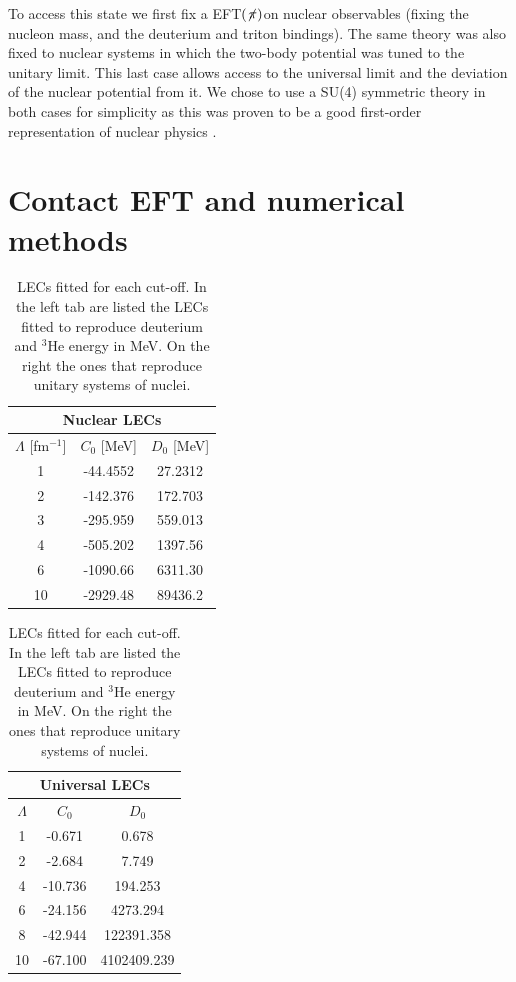 \documentclass[aps,onecolumn,preprintnumbers,amsmath,amssymb,nofootinbib,superscriptaddress,notitlepage]{revtex4-1}
\newcommand{\eftnopi}{\mbox{EFT$(\not \! \pi)$}}
\begin{document}
%
To access this state we first fix a \eftnopi on nuclear observables (fixing the nucleon mass, and the deuterium and triton bindings).
The same theory was also fixed to nuclear systems in which the two-body potential was tuned to the unitary limit.
This last case allows access to the universal limit and the deviation of the nuclear potential from it.
We chose to use a SU(4) symmetric theory in both cases for simplicity as this was proven to be a good first-order representation of nuclear physics \cite{Konig:2016utl}. 









\section{Contact EFT and numerical methods}

\begin{table}
    \centering
    \begin{tabular}{|ccc|}
    \hline
    \multicolumn{3}{|c|}{Nuclear LECs}\\
    \hline
         $\Lambda$ [fm$^{-1}$] & $C_0$ [MeV] & $D_0$ [MeV] \\
1   &	-44.4552	&	27.2312 \\
2	&   -142.376	&	172.703 \\
3	&   -295.959	&	559.013 \\
4	&   -505.202	&	1397.56 \\
6	&   -1090.66	&	6311.30 \\
10	&   -2929.48	&	89436.2 \\
    \hline
    \end{tabular}
    \quad
\begin{tabular}{|ccc|}
    \hline
    \multicolumn{3}{|c|}{Universal LECs}\\
    \hline        
        $\Lambda$  & $C_0$  & $D_0$  \\
1	&   -0.671	&	0.678 \\
2	&   -2.684	&	7.749 \\
4	&   -10.736	&	194.253 \\
6	&   -24.156	&	4273.294 \\
8	&   -42.944	&	122391.358 \\
10	&   -67.100	&	4102409.239 \\
    \hline
\end{tabular}
    \caption{LECs fitted for each cut-off. In the left tab are listed the LECs fitted to reproduce deuterium and $^3$He energy in MeV. On the right the ones that reproduce unitary systems of nuclei.}
    \label{tab:LECs_unprojected}
\end{table}
\end{document}
